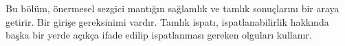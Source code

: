\documentclass[../../../include/open-logic-chapter]{subfiles}
\begin{document}

\begin{editorial}
  Bu bölüm, önermesel sezgici mantığın sağlamlık ve tamlık sonuçlarını bir
  araya getirir. Bir girişe gereksinimi vardır. Tamlık ispatı, ispatlanabilirlik
  hakkında başka bir yerde açıkça ifade edilip ispatlanması gereken olguları
  kullanır.
\end{editorial}


\OLEndChapterHook
\end{document}
